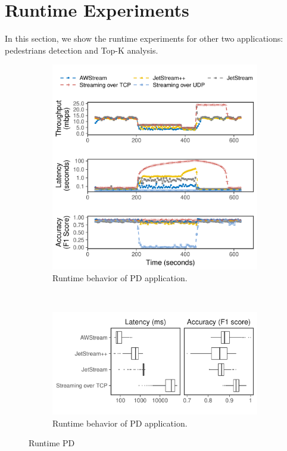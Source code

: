 \section{Runtime Experiments}
\label{appendix:more-runtime}


In this section, we show the runtime experiments for other two applications:
pedestrians detection and Top-K analysis.

\begin{figure}
  \begin{subfigure}[t]{\columnwidth}
    \centering
    \includegraphics[width=\columnwidth]{figures/runtime_mot-timeseries.pdf}
    \caption{Runtime behavior of PD application.}
    \label{fig:pd-runtime-timeseries}
  \end{subfigure}
  \vspace{1em}
  \\
  \begin{subfigure}[t]{\columnwidth}
    \centering
    \includegraphics[width=\columnwidth]{figures/runtime_mot-boxplot.pdf}
    \caption{Runtime behavior of PD application.}
    \label{fig:pd-runtime-boxplot}
  \end{subfigure}
  \caption{Runtime PD}
  \label{fig:pd-runtime}
\end{figure}

